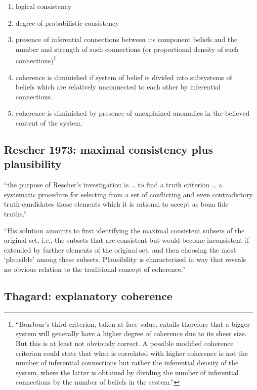 \documentclass[
  11pt,
  dvipsnames,enabledeprecatedfontcommands]{scrartcl}
\begin{document}
\begin{enumerate}
\def\labelenumi{\arabic{enumi}.}
\item
  logical consistency
\item
  degree of probabilistic consistency
\item
  presence of inferential connections between its component beliefs and
  the number and strength of such connections (or proportional density
  of such connections)\footnote{``BonJour's third criterion, taken at
    face value, entails therefore that a bigger system will generally
    have a higher degree of coherence due to its sheer size. But this is
    at least not obviously correct. A possible modified coherence
    criterion could state that what is correlated with higher coherence
    is not the number of inferential connections but rather the
    inferential density of the system, where the latter is obtained by
    dividing the number of inferential connections by the number of
    beliefs in the system.''}
\item
  coherence is diminished if system of belief is divided into subsystems
  of beliefs which are relatively unconnected to each other by
  inferential connections.
\item
  coherence is diminished by presence of unexplained anomalies in the
  believed content of the system.
\end{enumerate}

\hypertarget{rescher-1973-maximal-consistency-plus-plausibility}{%
\subsection{Rescher 1973: maximal consistency plus
plausibility}\label{rescher-1973-maximal-consistency-plus-plausibility}}

``the purpose of Rescher's investigation is \ldots{} to find a truth
criterion \ldots{} a systematic procedure for selecting from a set of
conflicting and even contradictory truth-candidates those elements which
it is rational to accept as bona fide truths.''

``His solution amounts to first identifying the maximal consistent
subsets of the original set, i.e., the subsets that are consistent but
would become inconsistent if extended by further elements of the
original set, and then choosing the most `plausible' among these
subsets. Plausibility is characterized in way that reveals no obvious
relation to the traditional concept of coherence.''

\hypertarget{thagard-explanatory-coherence}{%
\subsection{Thagard: explanatory
coherence}\label{thagard-explanatory-coherence}}
\end{document}
